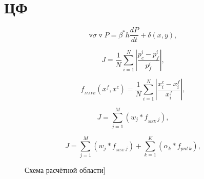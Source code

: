 \documentclass[14pt]{article}
\begin{document}
	\section{ЦФ}
	\begin{equation} \label{fil}
		\triangledown\sigma\triangledown P = \beta^*h\frac{dP}{dt}+\delta(x,y),
	\end{equation}
	
	\begin{equation} \label{mape}
		J=\frac{1}{N}\sum_{i=1}^N{\left\vert\frac{p_c^i-p_f^i}{p_f^i}\right\vert},
	\end{equation}

	\begin{equation} \label{mape}
		f_{_{MAPE}}(x^f,x^c)=\frac{1}{N}\sum_{i=1}^N{\left\vert\frac{x_i^c-x_i^f}{x_i^f}\right\vert},
	\end{equation}

	\begin{equation} \label{mape}
		J=\sum_{j=1}^M \left( w_j*f_{_{MSE} \ j} \right),
  	\end{equation}
  
  	\begin{equation} \label{mape}
   		J=\sum_{j=1}^M \left( w_j*f_{_{MSE} \ j} \right) + \sum_{k=1}^K \left( \alpha_k * f_{pnl \ k}\right),
    \end{equation}


\begin{figure}
	\caption{Схема расчётной области]}
	\label{fig:map}
\end{figure}
\end{document}
